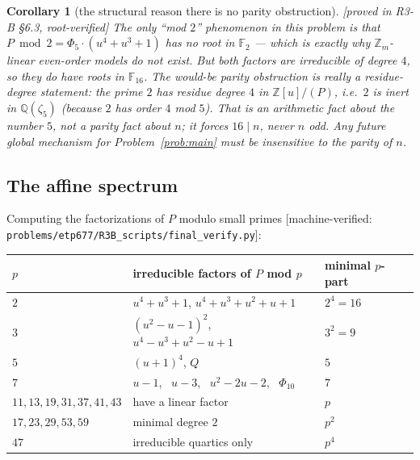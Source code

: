\documentclass[11pt]{article}
\theoremstyle{plain}
\newtheorem{corollary}[theorem]{Corollary}
\theoremstyle{definition}
\theoremstyle{remark}
\numberwithin{equation}{section}
\newcommand{\Z}{\mathbb{Z}}
\newcommand{\F}{\mathbb{F}}
\newcommand{\Q}{\mathbb{Q}}
\newcommand{\statusbox}[1]{{\small\sloppy\textsf{[#1]}}}
\newcommand{\MV}[1]{\statusbox{machine-verified: \texttt{#1}}}
\newcommand{\PROVED}[1]{\statusbox{proved in #1, root-verified}}
\begin{document}
\begin{corollary}[the structural reason there is no parity obstruction]\label{cor:inert}
\PROVED{R3-B \S6.3}
The only ``mod $2$'' phenomenon in this problem is that $P \bmod 2 = \Phi_5\cdot(u^4+u^3+1)$
has no root in $\F_2$ --- which is exactly why $\Z_m$-linear even-order models do not exist.
But both factors are irreducible of degree $4$, so they do have roots in $\F_{16}$. The
would-be parity obstruction is really a \emph{residue-degree} statement: the prime $2$ has
residue degree $4$ in $\Z[u]/(P)$, i.e.\ $2$ is inert in $\Q(\zeta_5)$ (because $2$ has order
$4$ mod $5$). That is an arithmetic fact about the number $5$, not a parity fact about $n$;
it forces $16\mid n$, never $n$ odd. \emph{Any future global mechanism for
Problem~\ref{prob:main} must be insensitive to the parity of $n$.}
\end{corollary}

\subsection{The affine spectrum}\label{sec:spectrumtable}

Computing the factorizations of $P$ modulo small primes \MV{problems\slash etp677\slash R3B\_scripts\slash final\_verify.py}:

\begin{center}
\begin{tabular}{lll}
\toprule
$p$ & irreducible factors of $P$ mod $p$ & minimal $p$-part\\
\midrule
$2$ & $u^4+u^3+1$, \quad $u^4+u^3+u^2+u+1$ & $2^4 = 16$\\
$3$ & $(u^2-u-1)^2$, \quad $u^4-u^3+u^2-u+1$ & $3^2 = 9$\\
$5$ & $(u+1)^4$, \quad $Q$ & $5$\\
$7$ & $u-1$, \ $u-3$, \ $u^2-2u-2$, \ $\Phi_{10}$ & $7$\\
$11,13,19,31,37,41,43$ & have a linear factor & $p$\\
$17,23,29,53,59$ & minimal degree $2$ & $p^2$\\
$47$ & irreducible quartics only & $p^4$\\
\bottomrule
\end{tabular}
\end{center}
\end{document}
